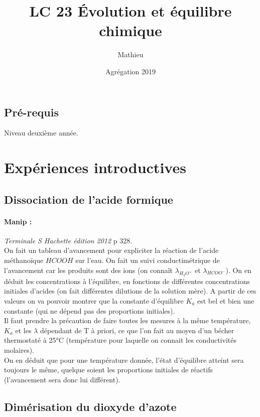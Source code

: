 \documentclass[12pt,prb,aps,epsf]{article}
\begin{document}
	
	\title{LC 23 Évolution et équilibre chimique}
	\author{Mathieu}
	\date{Agrégation 2019}

	\maketitle
	
	\tableofcontents
	
	\pagebreak

\subsection*{Pré-requis}
Niveau deuxième année.

\section{Expériences introductives}
\subsection{Dissociation de l'acide formique}
\paragraph{Manip :} \textit{Terminale S Hachette édition 2012} p 328. \\

On fait un tableau d'avancement pour expliciter la réaction de l'acide méthanoïque $HCOOH$ sur l'eau. On fait un suivi conductimétrique de l'avancement car les produits sont des ions (on connaît $\lambda_{H_3O^+}$ et $\lambda_{HCOO^-}$). On en déduit les concentrations à l'équilibre, en fonctions de différentes concentrations initiales d'acides (on fait différentes dilutions de la solution mère). A partir de ces valeurs on va pouvoir montrer que la constante d'équilibre $K_a$ est bel et bien une constante (qui ne dépend pas des proportions initiales).\\ Il faut prendre la précaution de faire toutes les mesures à la même température, $K_a$ et les $\lambda$ dépendant de T à priori, ce que l'on fait au moyen d'un bécher thermostaté à 25°C (température pour laquelle on connait les conductivités molaires).\\
On en déduit que pour une température donnée, l'état d'équilibre atteint sera toujours le même, quelque soient les proportions initiales de réactifs (l'avancement sera donc lui différent).

\subsection{Dimérisation du dioxyde d'azote}
\end{document}

